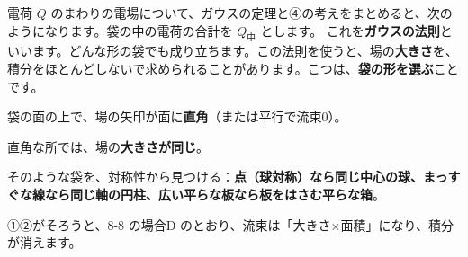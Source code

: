 
\leavevmode\label{bk:8-11:hosoku}電荷 $Q$ のまわりの電場について、ガウスの定理と④の考えをまとめると、次のようになります。袋の中の電荷の合計を $Q_{\text{中}}$ とします。
これを\textbf{ガウスの法則}といいます。どんな形の袋でも成り立ちます。この法則を使うと、場の\textbf{大きさ}を、積分をほとんどしないで求められることがあります。こつは、\textbf{袋の形を選ぶ}ことです。

\begin{enumerate}[label={\bkcircled[\bkTT]{\arabic*}}, leftmargin=2.4\zw, itemsep=1pt, topsep=2pt]
\item 袋の面の上で、場の矢印が面に\textbf{直角}（または平行で流束0）。
\item 直角な所では、場の\textbf{大きさが同じ}。
\item そのような袋を、対称性から見つける：\textbf{点（球対称）なら同じ中心の球、まっすぐな線なら同じ軸の円柱、広い平らな板なら板をはさむ平らな箱}。
\end{enumerate}
①②がそろうと、8-8 の場合D のとおり、流束は「大きさ×面積」になり、積分が消えます。

